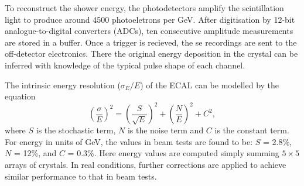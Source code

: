 To reconstruct the shower energy, the photodetectors amplify the scintillation light to produce around 4500 photoeletrons per GeV.
After digitisation by 12-bit analogue-to-digital converters (ADCs), ten consecutive amplitude measurements are stored in a buffer.
Once a trigger is recieved, the se recordings are sent to the off-detector electronics. 
There the original energy deposition in the crystal can be inferred with knowledge of the typical pulse shape of each channel.

The intrinsic energy resolution ($\sigma_E/E$) of the ECAL can be modelled by the equation
\begin{equation}
  \left(\frac{\sigma}{E} \right)^{2} =  
  \left(\frac{S}{\sqrt{E}} \right)^{2} +  
  \left(\frac{N}{E} \right)^{2} +  
  C^{2},
\label{eq:detector_ECALresolution}
\end{equation}
where $S$ is the stochastic term, $N$ is the noise term and $C$ is the constant term.
For energy in units of GeV, the values in beam tests are found to be: %
$S$ = 2.8\%, $N$ = 12\%, and $C$ = 0.3\%.
Here energy values are computed simply summing $5\times5$ arrays of crystals.
In real conditions, further corrections are applied to achieve similar performance to that in beam tests.

